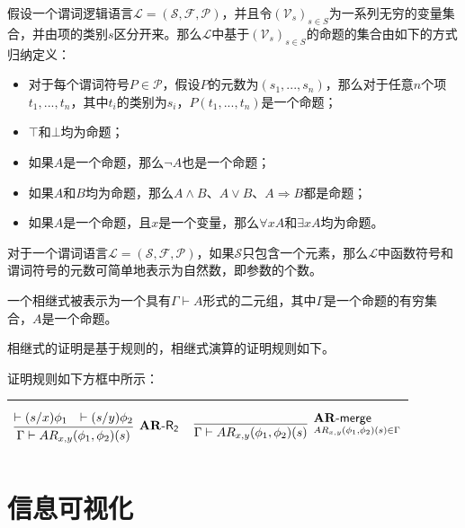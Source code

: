 \begin{definition}[命题]
		假设一个谓词逻辑语言$\mathcal{L}=(\mathcal{S}, \mathcal{F}, \mathcal{P})$，并且令$(\mathcal{V}_s)_{s\in S}$为一系列无穷的变量集合，并由项的类别$s$区分开来。那么$\mathcal{L}$中基于$(\mathcal{V}_s)_{s\in S}$的命题的集合由如下的方式归纳定义：
		\begin{itemize}
			\item 对于每个谓词符号$P\in\mathcal{P}$，假设$P$的元数为$(s_1,...,s_n)$，那么对于任意$n$个项$t_1,...,t_n$，其中$t_i$的类别为$s_i$，$P(t_1,...,t_n)$是一个命题；
			\item $\top$和$\bot$均为命题；
			\item 如果$A$是一个命题，那么$\neg A$也是一个命题；
			\item 如果$A$和$B$均为命题，那么$A\wedge B$、$A\vee B$、$A\Rightarrow B$都是命题；
			\item 如果$A$是一个命题，且$x$是一个变量，那么$\forall x A$和$\exists x A$均为命题。
		\end{itemize}
\end{definition}
对于一个谓词语言$\mathcal{L}=(\mathcal{S}, \mathcal{F}, \mathcal{P})$，如果$\mathcal{S}$只包含一个元素，那么$\mathcal{L}$中函数符号和谓词符号的元数可简单地表示为自然数，即参数的个数。
\begin{definition}[相继式]
	一个相继式被表示为一个具有$\Gamma\vdash A$形式的二元组，其中$\Gamma$是一个命题的有穷集合，$A$是一个命题。
\end{definition}
相继式的证明是基于规则的，相继式演算的证明规则如下。
\begin{definition}[相继式演算的规则]
	证明规则如下方框中所示：\\
	\begin{center}
			\begin{tabular}{|ll|}
			\hline
			$$
			\infer[^{\mbox{$\mathbf{AR}$-{$\mathsf{R_2}$}}}]{\Gamma \vdash AR_{x,y}(\phi_1,\phi_2)(s)}{\vdash (s/x)\phi_1 & \vdash (s/y)\phi_2}$$
			&
			$$\infer[^{\mbox{$\mathbf{AR}$-\textsf{merge}}}_{AR_{x,y}(\phi_1,\phi_2)(s)\in \Gamma}]{\Gamma \vdash AR_{x,y}(\phi_1,\phi_2)(s)}{}
			$$\\
			\hline
		\end{tabular}
	\end{center}

\end{definition}
\section{信息可视化}